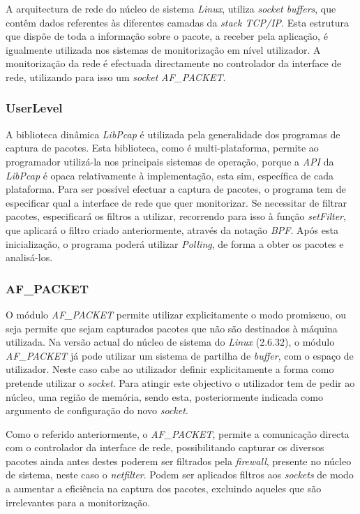 A arquitectura de rede do núcleo de sistema \textit{Linux}, utiliza \textit{socket buffers}, que contêm dados referentes às diferentes camadas da \textit{stack TCP/IP}.
Esta estrutura que dispõe de toda a informação sobre o pacote, a receber pela aplicação, é igualmente utilizada nos sistemas de monitorização em nível utilizador.
A monitorização da rede é efectuada directamente no controlador da interface de rede, utilizando para isso um \textit{socket} \textit{AF\_PACKET}.

\subsubsection{UserLevel}

A biblioteca dinâmica \textit{LibPcap} é utilizada pela generalidade dos programas de captura de pacotes.
Esta biblioteca, como é multi-plataforma, permite ao programador utilizá-la nos principais sistemas de operação, porque a \textit{API} da \textit{LibPcap} é opaca relativamente à implementação, esta sim, específica de cada plataforma.
Para ser possível efectuar a captura de pacotes, o programa tem de especificar qual a interface de rede que quer monitorizar.
Se necessitar de filtrar pacotes, especificará os filtros a utilizar, recorrendo para isso à função \textit{setFilter}, que aplicará o filtro criado anteriormente, através da notação \textit{BPF}.
Após esta inicialização, o programa poderá utilizar \textit{Polling}, de forma a obter os pacotes e analisá-los.

\subsubsection{AF\_PACKET}

O módulo \textit{AF\_PACKET} permite utilizar explicitamente o modo promiscuo, ou seja permite que sejam capturados pacotes que não são destinados à máquina utilizada.
Na versão actual do núcleo de sistema do \textit{Linux} (2.6.32), o módulo \textit{AF\_PACKET} já pode utilizar um sistema de partilha de \textit{buffer}, com o espaço de utilizador.
Neste caso cabe ao utilizador definir explicitamente a forma como pretende utilizar o \textit{socket}. 
Para atingir este objectivo o utilizador tem de pedir ao núcleo, uma região de memória, sendo esta, posteriormente indicada como argumento de configuração do novo \textit{socket}.

Como o referido anteriormente, o \textit{AF\_PACKET}, permite a comunicação directa com o controlador da interface de rede, possibilitando capturar os diversos pacotes ainda antes destes poderem ser filtrados pela \textit{firewall}, presente no núcleo de sistema, neste caso o \textit{netfilter}.
Podem ser aplicados filtros aos \textit{sockets} de modo a aumentar a eficiência na captura dos pacotes, excluindo aqueles que são irrelevantes para a monitorização.

